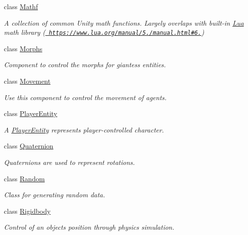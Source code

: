 \begin{DoxyCompactItemize}
class \mbox{\hyperlink{class_lua_1_1_mathf}{Mathf}}
\begin{DoxyCompactList}\small\item\em A collection of common Unity math functions. Largely overlaps with built-\/in \mbox{\hyperlink{namespace_lua}{Lua}} math library (\href{https://www.lua.org/manual/5.3/manual.html\#6.7}{\texttt{ https\+://www.\+lua.\+org/manual/5./manual.\+html\#6.}}) \end{DoxyCompactList}\item 
class \mbox{\hyperlink{class_lua_1_1_morphs}{Morphs}}
\begin{DoxyCompactList}\small\item\em Component to control the morphs for giantess entities. \end{DoxyCompactList}\item 
class \mbox{\hyperlink{class_lua_1_1_movement}{Movement}}
\begin{DoxyCompactList}\small\item\em Use this component to control the movement of agents. \end{DoxyCompactList}\item 
class \mbox{\hyperlink{class_lua_1_1_player_entity}{Player\+Entity}}
\begin{DoxyCompactList}\small\item\em A \mbox{\hyperlink{class_lua_1_1_player_entity}{Player\+Entity}} represents player-\/controlled character. \end{DoxyCompactList}\item 
class \mbox{\hyperlink{class_lua_1_1_quaternion}{Quaternion}}
\begin{DoxyCompactList}\small\item\em Quaternions are used to represent rotations. \end{DoxyCompactList}\item 
class \mbox{\hyperlink{class_lua_1_1_random}{Random}}
\begin{DoxyCompactList}\small\item\em Class for generating random data. \end{DoxyCompactList}\item 
class \mbox{\hyperlink{class_lua_1_1_rigidbody}{Rigidbody}}
\begin{DoxyCompactList}\small\item\em Control of an object\textquotesingle{}s position through physics simulation. \end{DoxyCompactList}\item 

\end{DoxyCompactItemize}
